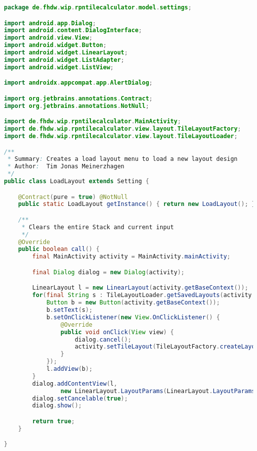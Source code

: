 \begin{lstlisting}[caption=LoadLayout (Meinerzhagen),label=list:LoadLayout,language=Java]
package de.fhdw.wip.rpntilecalculator.model.settings;

import android.app.Dialog;
import android.content.DialogInterface;
import android.view.View;
import android.widget.Button;
import android.widget.LinearLayout;
import android.widget.ListAdapter;
import android.widget.ListView;

import androidx.appcompat.app.AlertDialog;

import org.jetbrains.annotations.Contract;
import org.jetbrains.annotations.NotNull;

import de.fhdw.wip.rpntilecalculator.MainActivity;
import de.fhdw.wip.rpntilecalculator.view.layout.TileLayoutFactory;
import de.fhdw.wip.rpntilecalculator.view.layout.TileLayoutLoader;

/**
 * Summary: Creates a load layout menu to load a new layout design
 * Author:  Tim Jonas Meinerzhagen
 */
public class LoadLayout extends Setting {

    @Contract(pure = true) @NotNull
    public static LoadLayout getInstance() { return new LoadLayout(); }

    /**
     * Clears the entire Stack and current input
     */
    @Override
    public boolean call() {
        final MainActivity activity = MainActivity.mainActivity;

        final Dialog dialog = new Dialog(activity);

        LinearLayout l = new LinearLayout(activity.getBaseContext());
        for(final String s : TileLayoutLoader.getSavedLayouts(activity.getBaseContext())){
            Button b = new Button(activity.getBaseContext());
            b.setText(s);
            b.setOnClickListener(new View.OnClickListener() {
                @Override
                public void onClick(View view) {
                    dialog.cancel();
                    activity.setTileLayout(TileLayoutFactory.createLayout(activity.getBaseContext(), s));
                }
            });
            l.addView(b);
        }
        dialog.addContentView(l,
                new LinearLayout.LayoutParams(LinearLayout.LayoutParams.WRAP_CONTENT, LinearLayout.LayoutParams.WRAP_CONTENT));
        dialog.setCancelable(true);
        dialog.show();

        return true;
    }

}
\end{lstlisting}    

